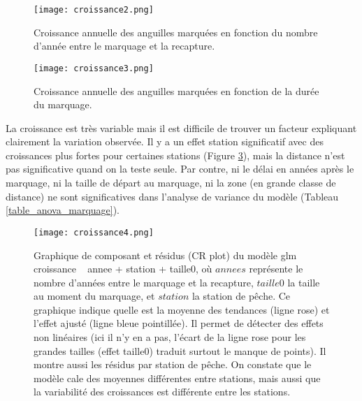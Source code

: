 \documentclass[10pt,twocolumn,titlepage,twoside]{article}\usepackage[]{graphicx}\usepackage[]{color}
\begin{document}
\begin{figure}[htbp]
\centering
\texttt{[image: croissance2.png]}
\caption[Croissance annuelles des anguilles marquées]{Croissance annuelle des
anguilles marquées en fonction du nombre d'année entre le marquage et la
recapture.}
\label{croissance2}
\end{figure}


\begin{figure}[htbp]
\centering
\texttt{[image: croissance3.png]}
\caption[Croissance annuelles des anguilles marquées]{Croissance annuelle des
anguilles marquées en fonction de la durée du marquage.}
\label{croissance3}
\end{figure}


La croissance est très variable mais il est difficile de trouver un facteur
expliquant clairement la variation observée. Il y a un effet station significatif avec des croissances plus fortes
pour certaines stations (Figure \ref{croissance4}), mais la distance n'est pas significative
quand on la teste seule. Par contre, ni le délai en années après le
marquage, ni la taille de départ au marquage, ni la zone (en grande
classe de distance) ne sont significatives dans l'analyse de variance du
modèle (Tableau \ref{table_anova_marquage}). 



\begin{figure}[htbp]
\centering
\texttt{[image: croissance4.png]}
\caption[Graphique de composant et résidus du modèle glm croissance ~ annee +
station + taille initiale.]{Graphique de composant et résidus (CR plot) du
modèle glm croissance ~ annee + station + taille0, où $annees$ représente le
nombre d'années entre le marquage et la recapture, $taille0$ la taille au moment
du marquage, et $station$ la station de pêche. Ce graphique indique quelle est la
moyenne des tendances (ligne rose) et l'effet ajusté (ligne bleue
pointillée).
Il permet de détecter des effets non linéaires (ici il n'y en a pas, l'écart de
la ligne rose pour les grandes tailles
(effet taille0) traduit surtout le manque de points). Il montre aussi les
résidus par station de pêche. On constate que le modèle cale des moyennes
différentes entre stations, mais aussi que la variabilité des croissances est
différente entre les stations.}
\label{croissance4}
\end{figure}


\end{document}
